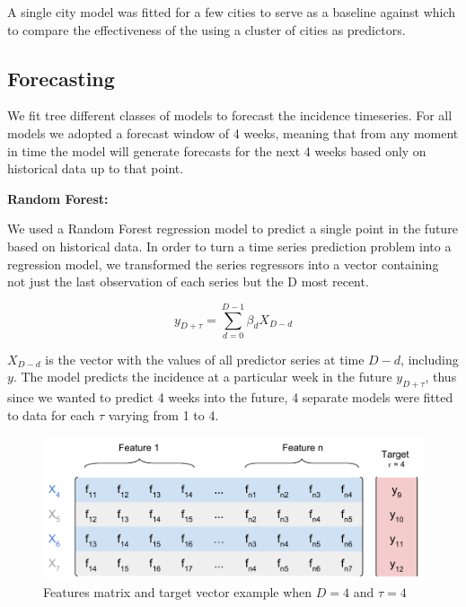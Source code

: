 \documentclass[12pt]{report}
\begin{document}
A single city model was fitted  for a few  cities to serve as a 
baseline against which to compare the effectiveness of the using a cluster of  
cities as predictors.

\subsection{Forecasting}

We fit tree different classes of models to forecast the incidence timeseries. For all models we adopted a forecast window of 4 weeks, meaning that from any moment in time the model will generate forecasts for the next 4 weeks based only on historical data up to that point.

\begin{description}
 \item \textbf{Random Forest:}
 
 We used a Random Forest regression model to predict a single point in the future based on historical data. In order to turn a time series prediction problem into a regression model, we transformed the series regressors into a vector containing not just the last observation of each series but the {\cal D} most recent.
 
\begin{equation}
y_{D+\tau} = \sum_{d=0}^{D-1} \beta_d X_{D-d}
\end{equation}

$X_{D-d}$ is the vector with the values of all predictor series at time $D-d$, including $y$. The model predicts the incidence at a particular week in the future $y_{D+\tau}$, thus since we wanted to predict 4 weeks into the future, 4 separate models were fitted to data for each $\tau$ varying from 1 to 4.


 \begin{figure}
 \includegraphics[width=\textwidth]{rf_features.pdf}
 \caption{Features matrix and target vector example when $D=4$ and $\tau = 4$ }
 \label{fig:rf_matrix}
\end{figure}
 

\end{description}
\end{document}

